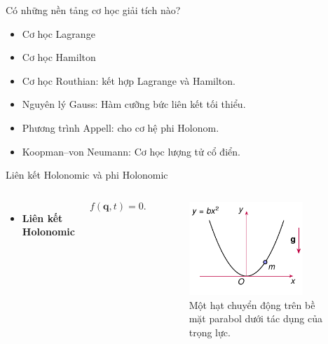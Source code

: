 \begin{frame}{Có những nền tảng cơ học giải tích nào?}
    \begin{itemize}
        \item Cơ học Lagrange
        \item Cơ học Hamilton
        \item Cơ học Routhian: kết hợp Lagrange và Hamilton.
        \item Nguyên lý Gauss: Hàm cưỡng bức liên kết tối thiểu.
        \item Phương trình Appell: cho cơ hệ phi Holonom.
        \item Koopman–von Neumann: Cơ học lượng tử cổ điển.
    \end{itemize}
\end{frame}

\begin{frame}{Liên kết Holonomic và phi Holonomic}
\vspace{-4mm}
\begin{columns}
    \begin{itemize}
        \item\textbf{Liên kết Holonomic}
    \end{itemize}
    \begin{equation}
        f \left( \mathbf{q}, t \right) = 0.
    \end{equation}
    \vspace{-9mm}
    \begin{figure}
        \centering
        \includegraphics[width=0.8\textwidth]{Figures/Parabol_motion.pdf}
        \vspace{-6mm}
        \caption{Một hạt chuyển động trên bề mặt parabol dưới tác dụng của trọng lực.}
    \end{figure}


\end{columns}
\end{frame}
